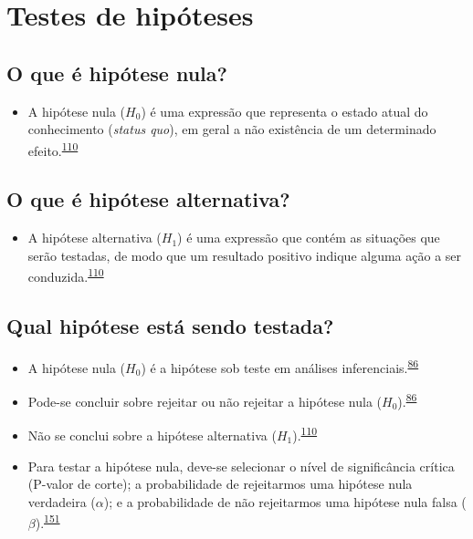 \documentclass[
  a4paper,
]{book}
\providecommand{\tightlist}{%
  \setlength{\itemsep}{0pt}\setlength{\parskip}{0pt}}
\begin{document}
\hypertarget{erros-inferencia}{%
\section{Testes de hipóteses}\label{erros-inferencia}}

\hypertarget{o-que-uxe9-hipuxf3tese-nula}{%
\subsection{O que é hipótese nula?}\label{o-que-uxe9-hipuxf3tese-nula}}

\begin{itemize}
\tightlist
\item
  A hipótese nula (\(H_{0}\)) é uma expressão que representa o estado atual do conhecimento (\emph{status quo}), em geral a não existência de um determinado efeito.\textsuperscript{\protect\hyperlink{ref-kanji2006}{110}}
\end{itemize}

\hypertarget{o-que-uxe9-hipuxf3tese-alternativa}{%
\subsection{O que é hipótese alternativa?}\label{o-que-uxe9-hipuxf3tese-alternativa}}

\begin{itemize}
\tightlist
\item
  A hipótese alternativa (\(H_{1}\)) é uma expressão que contém as situações que serão testadas, de modo que um resultado positivo indique alguma ação a ser conduzida.\textsuperscript{\protect\hyperlink{ref-kanji2006}{110}}
\end{itemize}

\hypertarget{qual-hipuxf3tese-estuxe1-sendo-testada}{%
\subsection{Qual hipótese está sendo testada?}\label{qual-hipuxf3tese-estuxe1-sendo-testada}}

\begin{itemize}
\item
  A hipótese nula (\(H_{0}\)) é a hipótese sob teste em análises inferenciais.\textsuperscript{\protect\hyperlink{ref-Ali2016}{86}}
\item
  Pode-se concluir sobre rejeitar ou não rejeitar a hipótese nula (\(H_{0}\)).\textsuperscript{\protect\hyperlink{ref-Ali2016}{86}}
\item
  Não se conclui sobre a hipótese alternativa (\(H_{1}\)).\textsuperscript{\protect\hyperlink{ref-kanji2006}{110}}
\item
  Para testar a hipótese nula, deve-se selecionar o nível de significância crítica (P-valor de corte); a probabilidade de rejeitarmos uma hipótese nula verdadeira (\(\alpha\)); e a probabilidade de não rejeitarmos uma hipótese nula falsa (\(\beta\)).\textsuperscript{\protect\hyperlink{ref-Curran-Everett2009}{151}}
\end{itemize}
\end{document}
